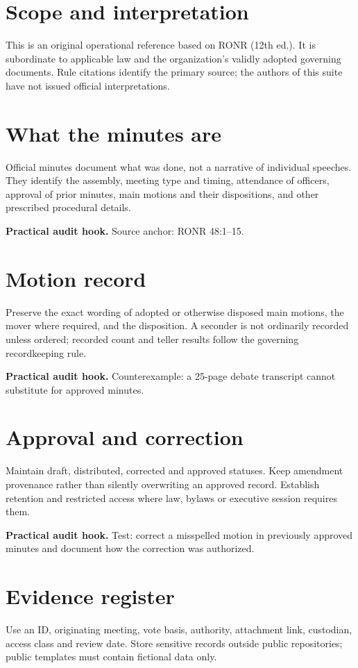 \documentclass[11pt]{article}
\begin{document}
\SuiteOpen
\section{Scope and interpretation}
This is an original operational reference based on RONR (12th ed.). It is subordinate to applicable law and the organization’s validly adopted governing documents. Rule citations identify the primary source; the authors of this suite have not issued official interpretations.

\section{What the minutes are}
Official minutes document what was done, not a narrative of individual speeches. They identify the assembly, meeting type and timing, attendance of officers, approval of prior minutes, main motions and their dispositions, and other prescribed procedural details.

\textbf{Practical audit hook.} Source anchor: RONR 48:1--15.

\section{Motion record}
Preserve the exact wording of adopted or otherwise disposed main motions, the mover where required, and the disposition. A seconder is not ordinarily recorded unless ordered; recorded count and teller results follow the governing recordkeeping rule.

\textbf{Practical audit hook.} Counterexample: a 25-page debate transcript cannot substitute for approved minutes.

\section{Approval and correction}
Maintain draft, distributed, corrected and approved statuses. Keep amendment provenance rather than silently overwriting an approved record. Establish retention and restricted access where law, bylaws or executive session requires them.

\textbf{Practical audit hook.} Test: correct a misspelled motion in previously approved minutes and document how the correction was authorized.

\section{Evidence register}
Use an ID, originating meeting, vote basis, authority, attachment link, custodian, access class and review date. Store sensitive records outside public repositories; public templates must contain fictional data only.
\end{document}
